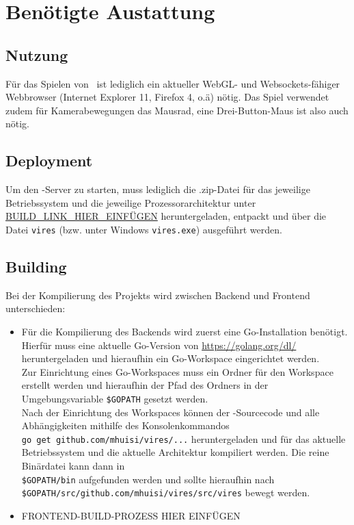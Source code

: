 \section{Benötigte Austattung}
\subsection{Nutzung}
Für das Spielen von \vires\ ist lediglich ein aktueller WebGL- und Websockets-fähiger Webbrowser (Internet Explorer 11, Firefox 4, o.ä) nötig.
Das Spiel verwendet zudem für Kamerabewegungen das Mausrad, eine Drei-Button-Maus ist also auch nötig.

\subsection{Deployment}
Um den \vires-Server zu starten, muss lediglich die .zip-Datei für das jeweilige Betriebssystem und die jeweilige Prozessorarchitektur unter 
\url{BUILD_LINK_HIER_EINFÜGEN} heruntergeladen, entpackt und über die Datei \verb+vires+ (bzw. unter Windows \verb+vires.exe+) ausgeführt werden.

\subsection{Building}
Bei der Kompilierung des Projekts wird zwischen Backend und Frontend unterschieden:
\begin{itemize}
	\item Für die Kompilierung des Backends wird zuerst eine Go-Installation benötigt.\\
	Hierfür muss eine aktuelle Go-Version von \url{https://golang.org/dl/} heruntergeladen und hieraufhin ein Go-Workspace eingerichtet werden.\\
	Zur Einrichtung eines Go-Workspaces muss ein Ordner für den Workspace erstellt werden und hieraufhin der Pfad des Ordners in der Umgebungsvariable 
	\verb+$GOPATH+ gesetzt werden.\\
	Nach der Einrichtung des Workspaces können der \vires-Sourcecode und alle Abhängigkeiten mithilfe des Konsolenkommandos \\
	\verb+go get github.com/mhuisi/vires/...+ heruntergeladen und für das aktuelle Betriebssystem und die aktuelle Architektur kompiliert werden. 
	Die reine Binärdatei kann dann in \\
	\verb+$GOPATH/bin+ aufgefunden werden und sollte hieraufhin nach\\
	\verb+$GOPATH/src/github.com/mhuisi/vires/src/vires+ bewegt werden.
	\item FRONTEND-BUILD-PROZESS HIER EINFÜGEN
\end{itemize}
